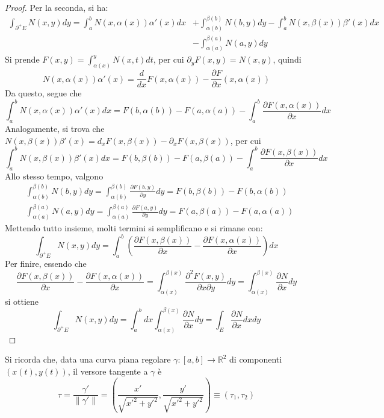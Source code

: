 \documentclass[11pt, a4paper]{scrartcl}
\theoremstyle{definition}
\numberwithin{esempio}{section}
\theoremstyle{definition}
\numberwithin{obs}{section}
\numberwithin{nota}{section}
\numberwithin{equation}{subsection}
\begin{document}
\begin{teorema}
\begin{proof}
Per la seconda, si ha:
\[
	\begin{split}
		\int_{\partial ^+ E} N(x,y) dy = \int_{a} ^b N(x,\alpha (x)) \alpha '(x) dx &+ \int_{\alpha (b)} ^{\beta (b)} N(b,y)  dy - \int_{a} ^b N(x,\beta (x)) \beta '(x) dx\\
											    &- \int_{\alpha (a)} ^{\beta (a)} N(a,y) dy
	\end{split}
\] 
Si prende $F(x,y) = \int_{\alpha (x)} ^{y} N(x,t) dt$, per cui $\partial _y F(x,y) = N(x,y)$, quindi
\[
N(x,\alpha (x)) \alpha '(x) = \frac{d }{d x} F(x,\alpha (x)) - \frac{\partial F}{\partial x} (x,\alpha (x))
\] 
Da questo, segue che
\[
\int_{a} ^b N(x,\alpha (x)) \alpha '(x) dx = F(b,\alpha (b)) - F(a,\alpha (a)) - \int_{a} ^b \frac{\partial F(x,\alpha (x))}{\partial x}  dx
\] 
Analogamente, si trova che $N(x,\beta (x)) \beta '(x) = d_x F(x,\beta (x)) - \partial _x F(x,\beta (x))$, per cui
\[
\int_{a} ^b N(x,\beta (x)) \beta '(x) dx = F(b,\beta (b)) - F(a,\beta (a)) - \int_{a} ^b \frac{\partial F(x,\beta (x))}{\partial x} dx
\] 
Allo stesso tempo, valgono
\[
\begin{split}
	&\int_{\alpha (b)} ^{\beta (b)} N(b,y) dy = \int_{\alpha (b)} ^{\beta (b)} \frac{\partial F(b,y)}{\partial y} dy = F(b,\beta (b)) - F(b,\alpha (b))\\
	& \int_{\alpha (a)} ^{\beta (a)} N(a,y) dy = \int_{\alpha (a)} ^{\beta (a)} \frac{\partial F(a,y)}{\partial y} dy = F(a,\beta (a)) - F(a,\alpha (a))
\end{split}
\] 
Mettendo tutto insieme, molti termini si semplificano e si rimane con:
\[
\int_{\partial ^+ E} N(x,y) dy = \int_{a} ^b \left(\frac{\partial F(x,\beta (x))}{\partial x}-\frac{\partial F(x,\alpha (x))}{\partial x}  \right) dx
\] 
Per finire, essendo che
\[
\frac{\partial F(x,\beta (x))}{\partial x}-\frac{\partial F(x,\alpha (x))}{\partial x} = \int_{\alpha (x)} ^{\beta (x)} \frac{\partial ^2F(x,y)}{\partial x\partial y} dy = \int_{\alpha (x)} ^{\beta (x)} \frac{\partial N}{\partial x} dy
\] 
si ottiene
\[
\int_{\partial ^+E} N(x,y) dy = \int_{a} ^b dx \int_{\alpha (x)} ^{\beta (x)} \frac{\partial N}{\partial x} dy=\int_{E} \frac{\partial N}{\partial x} dxdy
\] 
\end{proof}
\end{teorema}
Si ricorda che, data una curva piana regolare $\gamma:\left[ a,b \right] \to \mathbb{R}^2$ di componenti $(x(t), y(t))$, il versore tangente a $\gamma$ \`e
\[
\tau = \frac{\gamma'}{\left\lVert \gamma' \right\rVert } = \left(\frac{x'}{\sqrt{x'^2 + y'^2} }, \frac{y'}{\sqrt{x'^2 + y'^2} }\right) \equiv (\tau _1, \tau _2)
\] 
\end{document}
